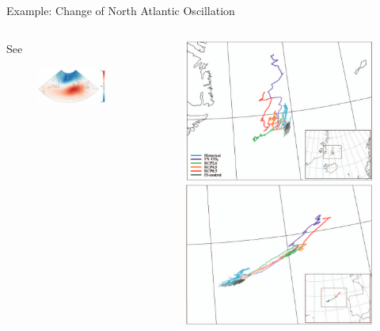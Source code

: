 \begin{frame}{Example: Change of North Atlantic Oscillation}

  \begin{columns}
    \begin{column}{.5 \textwidth}
      \begin{center}
        
    See \citeauthor{vietinghoff_visual_2021} \cite{vietinghoff_visual_2021}
      \end{center}
      
    \begin{figure}[t]
      \centering
      \includegraphics[width=\columnwidth]{imglib/nao_eof_index.png}
    \end{figure}
      
    \end{column}
    \begin{column}{.5 \textwidth}
    \begin{figure}[t]
      \centering
      \includegraphics[width=.5 \columnwidth]{imglib/nao_mov_island.png}
      \includegraphics[width=.5 \columnwidth]{imglib/nao_mov_azore.png}
    \end{figure}
      
    \end{column}
    
  \end{columns}
  
\end{frame}


